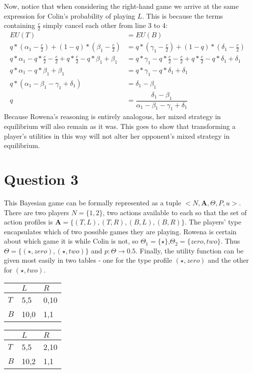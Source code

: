 \documentclass[10pt,a4paper]{article}
\begin{document}
Now, notice that when considering the right-hand game we arrive at the same expression for Colin's probability of playing $L$. This is because the terms containing $\tfrac{c}{2}$ simply cancel each other from line 3 to 4:
\begin{align}
EU(T)&=EU(B) \\
q*(\alpha_1-\tfrac{c}{2})+(1-q)*(\beta_1-\tfrac{c}{2})&=q*(\gamma_1-\tfrac{c}{2})+(1-q)*(\delta_1-\tfrac{c}{2}) \\
q*\alpha_1-q*\tfrac{c}{2}-\tfrac{c}{2}+q*\tfrac{c}{2}-q*\beta_1+\beta_1&=q*\gamma_1-q*\tfrac{c}{2}-\tfrac{c}{2}+q*\tfrac{c}{2}-q*\delta_1+\delta_1 \\
q*\alpha_1-q*\beta_1+\beta_1&=q*\gamma_1-q*\delta_1+\delta_1 \\
q*(\alpha_1-\beta_1-\gamma_1+\delta_1)&=\delta_1-\beta_1 \\
q &= \dfrac{\delta_1-\beta_1}{\alpha_1-\beta_1-\gamma_1+\delta_1}
\end{align}
Because Rowena's reasoning is entirely analogous, her mixed strategy in equilibrium will also remain as it was. This goes to show that transforming a player's utilities in this way will not alter her opponent's mixed strategy in equilibrium.
\section*{Question 3}
This Bayesian game can be formally represented as a tuple $<N,\boldsymbol{A}, \Theta, P, u>$. There are two players $N=\{1,2\}$, two actions available to each so that the set of action profiles is $\boldsymbol{A}=\{(T,L),(T,R),(B,L),(B,R)\}$. The players' type encapsulates which of two possible games they are playing. Rowena is certain about which game it is while Colin is not, so $\Theta_1=\{\star\}$,$\Theta_2=\{zero,two\}$. Thus $\Theta=\{(\star,zero),(\star,two)\}$ and $p: \Theta \rightarrow 0.5$. Finally, the utility function can be given most easily in two tables - one for the type profile $(\star,zero)$ and the other for $(\star,two)$.
\begin{table}[h]
\centering
\begin{tabular}[l]{|l|l|l|}
\hline
          & $L$ & $R$  \\ \hline
$T$     & 5,5   & 0,10 \\ \hline
$B$		& 10,0	& 1,1 \\ \hline
\end{tabular}
\quad
\begin{tabular}[r]{|l|l|l|}
\hline
          & $L$ & $R$  \\ \hline
$T$     & 5,5   & 2,10 \\ \hline
$B$		& 10,2	& 1,1 \\ \hline
\end{tabular}
\end{table}
\end{document}
